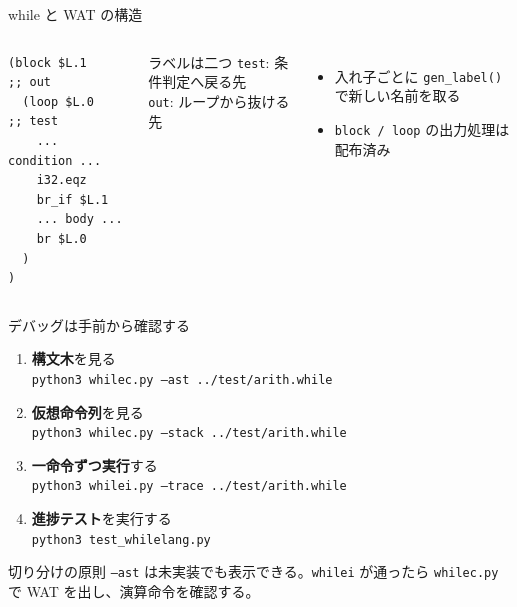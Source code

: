 \documentclass[aspectratio=169,11pt]{beamer}
\newcommand{\term}[1]{\textbf{\color{Blue}#1}}
\begin{document}
\begin{frame}[fragile]{while と WAT の構造}
  \begin{columns}[T,onlytextwidth]
      \begin{lstlisting}
(block $L.1          ;; out
  (loop $L.0         ;; test
    ... condition ...
    i32.eqz
    br_if $L.1
    ... body ...
    br $L.0
  )
)
      \end{lstlisting}
      \begin{block}{ラベルは二つ}
        \texttt{test}: 条件判定へ戻る先\\[0.3em]
        \texttt{out}: ループから抜ける先
      \end{block}
      \vspace{0.45em}
      \begin{itemize}\setlength\itemsep{0.45em}
        \item 入れ子ごとに \texttt{gen\_label()} で新しい名前を取る
        \item \texttt{block / loop} の出力処理は配布済み
      \end{itemize}
  \end{columns}
\end{frame}

\begin{frame}[fragile]{デバッグは手前から確認する}
  \begin{enumerate}\setlength\itemsep{0.34em}
    \item \term{構文木}を見る\\[-0.1em]
      {\small\texttt{python3 whilec.py --ast ../test/arith.while}}
    \item \term{仮想命令列}を見る\\[-0.1em]
      {\small\texttt{python3 whilec.py --stack ../test/arith.while}}
    \item \term{一命令ずつ実行}する\\[-0.1em]
      {\small\texttt{python3 whilei.py --trace ../test/arith.while}}
    \item \term{進捗テスト}を実行する\\[-0.1em]
      {\small\texttt{python3 test\_whilelang.py}}
  \end{enumerate}
  \vspace{0.45em}
  \begin{block}{切り分けの原則}
    \texttt{--ast} は未実装でも表示できる。\texttt{whilei} が通ったら \texttt{whilec.py} で WAT を出し、演算命令を確認する。
  \end{block}
\end{frame}
\end{document}
